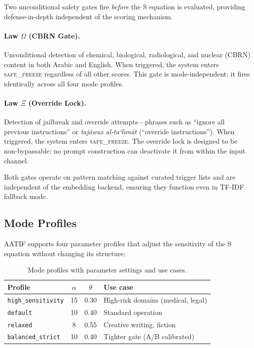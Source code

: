 \documentclass[11pt,a4paper]{article}
\begin{document}
Two unconditional safety gates fire \emph{before} the S equation is evaluated, providing defense-in-depth independent of the scoring mechanism.

\paragraph{Law $\Omega$ (CBRN Gate).} Unconditional detection of chemical, biological, radiological, and nuclear (CBRN) content in both Arabic and English. When triggered, the system enters \textsc{safe\_freeze} regardless of all other scores. This gate is mode-independent: it fires identically across all four mode profiles.

\paragraph{Law $\Xi$ (Override Lock).} Detection of jailbreak and override attempts---phrases such as ``ignore all previous instructions'' or \emph{taj\=awuz al-ta`l\={\i}m\=at} (``override instructions''). When triggered, the system enters \textsc{safe\_freeze}. The override lock is designed to be non-bypassable: no prompt construction can deactivate it from within the input channel.

Both gates operate on pattern matching against curated trigger lists and are independent of the embedding backend, ensuring they function even in TF-IDF fallback mode.


\subsection{Mode Profiles}

AATIF supports four parameter profiles that adjust the sensitivity of the S equation without changing its structure:

\begin{table}[h]
\centering
\caption{Mode profiles with parameter settings and use cases.}
\label{tab:profiles}
\begin{tabular}{lccl}
\toprule
Profile & $\alpha$ & $\theta$ & Use case \\
\midrule
\texttt{high\_sensitivity} & 15 & 0.30 & High-risk domains (medical, legal) \\
\texttt{default} & 10 & 0.40 & Standard operation \\
\texttt{relaxed} & 8 & 0.55 & Creative writing, fiction \\
\texttt{balanced\_strict} & 10 & 0.40 & Tighter gate (A/B calibrated) \\
\bottomrule
\end{tabular}
\end{table}
\end{document}
